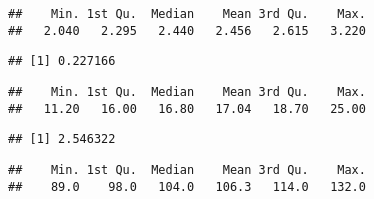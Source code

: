 \documentclass[
]{article}
\newenvironment{Shaded}{\begin{snugshade}}{\end{snugshade}}
\newcommand{\DataTypeTok}[1]{\textcolor[rgb]{0.13,0.29,0.53}{#1}}
\newcommand{\KeywordTok}[1]{\textcolor[rgb]{0.13,0.29,0.53}{\textbf{#1}}}
\newcommand{\NormalTok}[1]{#1}
\newcommand{\OperatorTok}[1]{\textcolor[rgb]{0.81,0.36,0.00}{\textbf{#1}}}
\newcommand{\StringTok}[1]{\textcolor[rgb]{0.31,0.60,0.02}{#1}}
\begin{document}
\begin{verbatim}
##    Min. 1st Qu.  Median    Mean 3rd Qu.    Max. 
##   2.040   2.295   2.440   2.456   2.615   3.220
\end{verbatim}

\begin{Shaded}
\end{Shaded}

\begin{verbatim}
## [1] 0.227166
\end{verbatim}

\begin{Shaded}
\end{Shaded}

\begin{verbatim}
##    Min. 1st Qu.  Median    Mean 3rd Qu.    Max. 
##   11.20   16.00   16.80   17.04   18.70   25.00
\end{verbatim}

\begin{Shaded}
\end{Shaded}

\begin{verbatim}
## [1] 2.546322
\end{verbatim}

\begin{Shaded}
\end{Shaded}

\begin{verbatim}
##    Min. 1st Qu.  Median    Mean 3rd Qu.    Max. 
##    89.0    98.0   104.0   106.3   114.0   132.0
\end{verbatim}

\begin{Shaded}
\end{Shaded}
\end{document}
